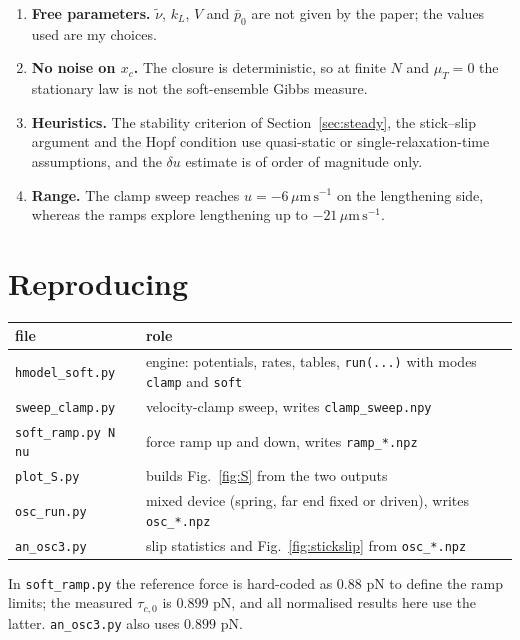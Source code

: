 \documentclass[11pt,a4paper]{article}
\newcommand{\umps}{\,\mu\mathrm{m\,s^{-1}}}
\newcommand{\tauz}{\tau_{c,0}}
\begin{document}
\begin{enumerate}
\item \textbf{Free parameters.} $\tilde\nu$, $k_L$, $V$ and $\bar p_0$ are not given by the paper; the values used are my choices.
\item \textbf{No noise on $x_c$.} The closure is deterministic, so at finite $N$ and $\mu_T=0$ the stationary law is not the soft-ensemble Gibbs measure.
\item \textbf{Heuristics.} The stability criterion of Section~\ref{sec:steady}, the stick--slip argument and the Hopf condition use quasi-static or single-relaxation-time assumptions, and the $\delta u$ estimate is of order of magnitude only.
\item \textbf{Range.} The clamp sweep reaches $u=-6\umps$ on the lengthening side, whereas the ramps explore lengthening up to $-21\umps$.
\end{enumerate}

\section{Reproducing}
\begin{center}
\begin{tabular}{lp{10.5cm}}
\toprule
file & role \\
\midrule
\texttt{hmodel\_soft.py} & engine: potentials, rates, tables, \texttt{run(...)} with modes \texttt{clamp} and \texttt{soft} \\
\texttt{sweep\_clamp.py} & velocity-clamp sweep, writes \texttt{clamp\_sweep.npy} \\
\texttt{soft\_ramp.py N nu} & force ramp up and down, writes \texttt{ramp\_*.npz} \\
\texttt{plot\_S.py} & builds Fig.~\ref{fig:S} from the two outputs \\
\texttt{osc\_run.py} & mixed device (spring, far end fixed or driven), writes \texttt{osc\_*.npz} \\
\texttt{an\_osc3.py} & slip statistics and Fig.~\ref{fig:stickslip} from \texttt{osc\_*.npz} \\
\bottomrule
\end{tabular}
\end{center}
In \texttt{soft\_ramp.py} the reference force is hard-coded as $0.88$ pN to define the ramp limits; the measured $\tauz$ is $0.899$ pN, and all normalised results here use the latter. \texttt{an\_osc3.py} also uses $0.899$ pN.

\appendix
\end{document}
